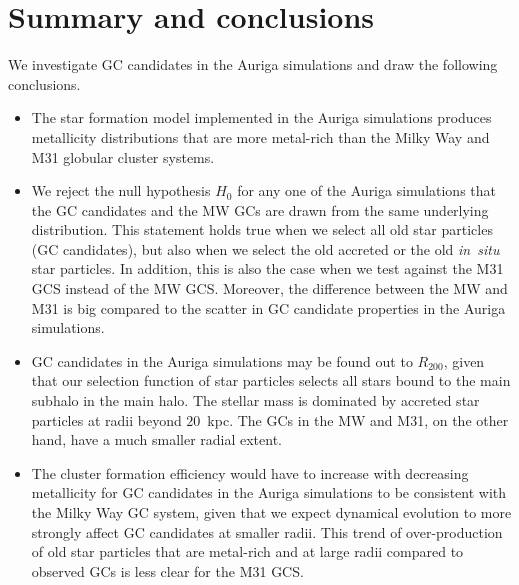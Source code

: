 \documentclass[a4paper,fleqn,usenatbib]{mnras}
\begin{document}
\section{Summary and conclusions}
\label{sec:conclusions}

We investigate GC candidates in the Auriga simulations and draw the following
conclusions.

\begin{itemize}
    \item The star formation model implemented in the Auriga simulations produces
    metallicity distributions that are more metal-rich than the Milky Way and M31
    globular cluster systems.

    \item We reject the null hypothesis $H_0$ for any one of the Auriga simulations 
    that the GC candidates and the MW GCs are drawn from the same underlying 
    distribution. This statement holds true when we select all old star particles 
    (GC candidates), but also when we select the old accreted or the old {\it in~situ} 
    star particles. In addition, this is also the case when we test against the 
    M31 GCS instead of the MW GCS. Moreover, the difference between the MW and
    M31 is big compared to the scatter in GC candidate properties in the Auriga
    simulations.

    \item GC candidates in the Auriga simulations may be found out to $R_{200}$,
    given that our selection function of star particles selects all stars bound
    to the main subhalo in the main halo. The stellar mass is dominated by accreted 
    star particles at radii beyond $20$~kpc. The GCs in the MW and M31, on the 
    other hand, have a much smaller radial extent.

    \item The cluster formation efficiency would have to increase with decreasing
    metallicity for GC candidates in the Auriga simulations to be consistent
    with the Milky Way GC system, given that we expect dynamical evolution to 
    more strongly affect GC candidates at smaller radii. This trend of over-production
    of old star particles that are metal-rich and at large radii compared to 
    observed GCs is less clear for the M31 GCS.

\end{itemize}
\end{document}
